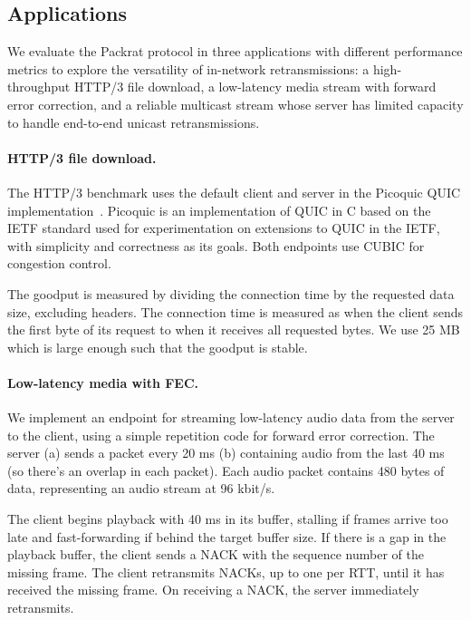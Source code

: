 \subsection{Applications}

We evaluate the Packrat protocol in three applications with different performance
metrics to explore the versatility of in-network retransmissions:
a high-throughput HTTP/3 file download, a low-latency media stream with forward
error correction, and a reliable multicast stream whose server has limited
capacity to handle end-to-end unicast retransmissions.

\paragraph{HTTP/3 file download.}

The HTTP/3 benchmark uses the default client and server in the Picoquic QUIC
implementation~\cite{picoquic}. Picoquic is an implementation of QUIC in C
based on the IETF standard used for experimentation on extensions to QUIC in
the IETF, with simplicity and correctness as its goals. Both endpoints use
CUBIC for congestion control.

The goodput is measured by dividing the connection time by the requested data
size, excluding headers.
The connection time is measured as when the client sends the first
byte of its request to when it receives all requested bytes.
We use 25 MB which is large enough such that the goodput is stable.

\paragraph{Low-latency media with FEC.}

We implement an endpoint for streaming low-latency audio data from the server
to the client, using a simple repetition code for forward error correction.
The server (a) sends a packet every 20 ms
(b) containing audio from the last 40 ms (so there's an overlap in each
packet). Each audio packet contains 480 bytes of data, representing an audio
stream at 96 kbit/s.

The client begins playback with 40 ms in its buffer, stalling if frames arrive
too late and fast-forwarding if behind the target buffer size.
If there is a gap in the
playback buffer, the client sends a NACK with the sequence number of the
missing frame. The client retransmits NACKs, up to one per RTT, until it has
received the missing frame. On receiving a NACK, the server immediately
retransmits.

